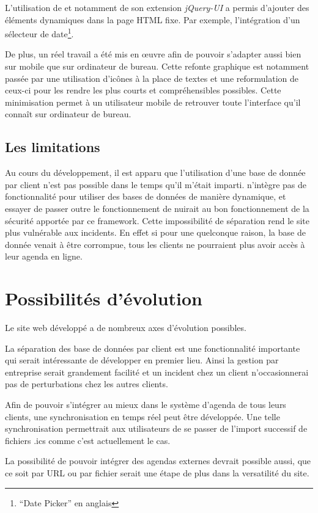 \documentclass[a4paper, 11pt]{report}
\begin{document}
    L'utilisation de \jquery et notamment de son extension \textit{jQuery-UI} a permis d'ajouter des éléments dynamiques dans la page HTML fixe. Par exemple, l'intégration d'un sélecteur de date\footnote{``Date Picker'' en anglais}.

    De plus, un réel travail a été mis en œuvre afin de pouvoir s'adapter aussi bien sur mobile que sur ordinateur de bureau. Cette refonte graphique est notamment passée par une utilisation d’icônes à la place de textes et une reformulation de ceux-ci pour les rendre les plus courts et compréhensibles possibles. Cette minimisation permet à un utilisateur mobile de retrouver toute l'interface qu'il connaît sur ordinateur de bureau.

    \subsection{Les limitations}
    Au cours du développement, il est apparu que l'utilisation d'une base de donnée par client n'est pas possible dans le temps qu'il m'était imparti. \symfony n'intègre pas de fonctionnalité pour utiliser des bases de données de manière dynamique, et essayer de passer outre le fonctionnement de \symfony nuirait au bon fonctionnement de la sécurité apportée par ce framework. Cette impossibilité de séparation rend le site plus vulnérable aux incidents. En effet si pour une quelconque raison, la base de donnée venait à être corrompue, tous les clients ne pourraient plus avoir accès à leur agenda en ligne.

\section{Possibilités d'évolution}
    Le site web développé a de nombreux axes d'évolution possibles.

    La séparation des base de données par client est une fonctionnalité importante qui serait intéressante de développer en premier lieu. Ainsi la gestion par entreprise serait grandement facilité et un incident chez un client n’occasionnerai pas de perturbations chez les autres clients.

    Afin de pouvoir s'intégrer au mieux dans le système d'agenda de tous leurs clients, une synchronisation en temps réel peut être développée. Une telle synchronisation permettrait aux utilisateurs de se passer de l'import successif de fichiers .ics comme c'est actuellement le cas.

    La possibilité de pouvoir intégrer des agendas externes devrait possible aussi, que ce soit par URL ou par fichier serait une étape de plus dans la versatilité du site.
\end{document}
